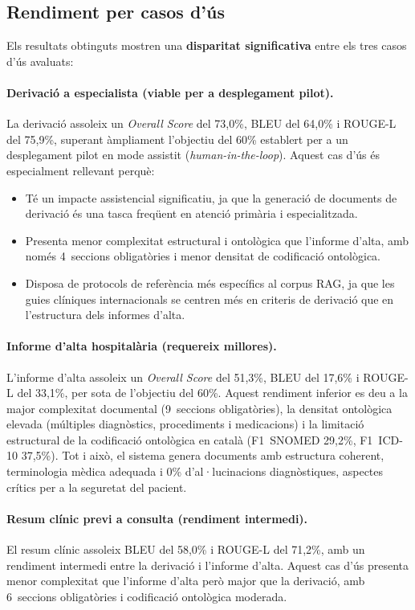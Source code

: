 \documentclass[CAT]{TFUOC}%
\begin{document}
\subsection{Rendiment per casos d'ús}

Els resultats obtinguts mostren una \textbf{disparitat significativa} entre els tres casos d'ús avaluats:

\paragraph{Derivació a especialista (viable per a desplegament pilot).}
La derivació assoleix un \textit{Overall Score} del 73,0\%, BLEU del 64,0\% i ROUGE-L del 75,9\%, superant àmpliament l'objectiu del 60\% establert per a un desplegament pilot en mode assistit (\textit{human-in-the-loop}). Aquest cas d'ús és especialment rellevant perquè:

\begin{itemize}
    \item Té un impacte assistencial significatiu, ja que la generació de documents de derivació és una tasca freqüent en atenció primària i especialitzada.
    \item Presenta menor complexitat estructural i ontològica que l'informe d'alta, amb només 4~seccions obligatòries i menor densitat de codificació ontològica.
    \item Disposa de protocols de referència més específics al corpus RAG, ja que les guies clíniques internacionals se centren més en criteris de derivació que en l'estructura dels informes d'alta.
\end{itemize}

\paragraph{Informe d'alta hospitalària (requereix millores).}
L'informe d'alta assoleix un \textit{Overall Score} del 51,3\%, BLEU del 17,6\% i ROUGE-L del 33,1\%, per sota de l'objectiu del 60\%. Aquest rendiment inferior es deu a la major complexitat documental (9~seccions obligatòries), la densitat ontològica elevada (múltiples diagnòstics, procediments i medicacions) i la limitació estructural de la codificació ontològica en català (F1~SNOMED 29,2\%, F1~ICD-10 37,5\%). Tot i això, el sistema genera documents amb estructura coherent, terminologia mèdica adequada i 0\% d'al·lucinacions diagnòstiques, aspectes crítics per a la seguretat del pacient.

\paragraph{Resum clínic previ a consulta (rendiment intermedi).}
El resum clínic assoleix BLEU del 58,0\% i ROUGE-L del 71,2\%, amb un rendiment intermedi entre la derivació i l'informe d'alta. Aquest cas d'ús presenta menor complexitat que l'informe d'alta però major que la derivació, amb 6~seccions obligatòries i codificació ontològica moderada.
\end{document}
